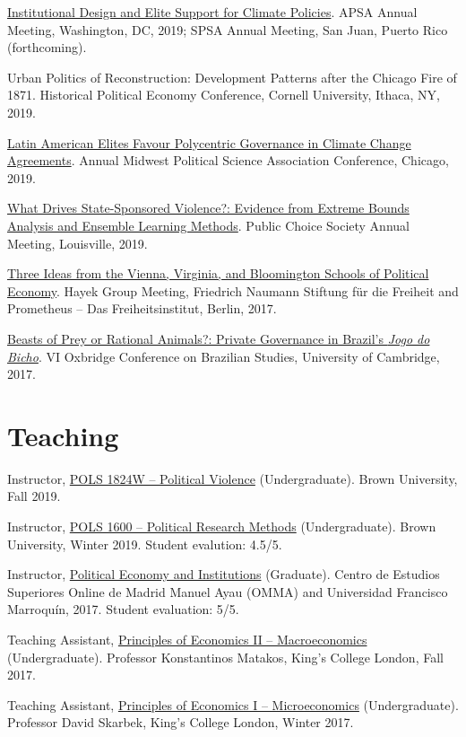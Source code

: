 \documentclass[a4paper]{article}
\renewenvironment{itemize}{
	\begin{list}{}{
			\setlength{\leftmargin}{1.5em}
		}
		}{
	\end{list}
}
\begin{document}
	\begin{itemize}
		\item \href{https://osf.io/9a6ch}{Institutional Design and Elite Support for Climate Policies}. APSA Annual Meeting, Washington, DC, 2019; SPSA Annual Meeting, San Juan, Puerto Rico (forthcoming).
		\item Urban Politics of Reconstruction: Development Patterns after the Chicago Fire of 1871. Historical Political Economy Conference, Cornell University, Ithaca, NY, 2019.
		\item \href{https://osf.io/9a6ch}{Latin American Elites Favour Polycentric Governance in Climate Change Agreements}. Annual Midwest Political Science Association Conference, Chicago, 2019.
		\item \href{http://danilofreire.github.io/pcs-2019}{What Drives State-Sponsored Violence?: Evidence from Extreme Bounds Analysis and Ensemble Learning Methods}. Public Choice Society Annual Meeting, Louisville, 2019.
		\item \href{https://www.overleaf.com/project/591ef5259fb58ede3dc4d369}{Three Ideas from the Vienna, Virginia, and Bloomington Schools of Political Economy}. Hayek Group Meeting, Friedrich Naumann Stiftung f{\"u}r die Freiheit and Prometheus -- Das Freiheitsinstitut, Berlin, 2017.
		\item \href{https://osf.io/se2jr}{Beasts of Prey or Rational Animals?: Private Governance in Brazil's \emph{Jogo do Bicho}}. VI Oxbridge Conference on Brazilian Studies, University of Cambridge, 2017.
	\end{itemize}

	\section*{Teaching}

	\begin{itemize}
	\item Instructor, \href{http://danilofreire.github.io/pols1842w}{POLS 1824W -- Political Violence} (Undergraduate). Brown University, Fall 2019.
	\item Instructor, \href{http://danilofreire.github.io}{POLS 1600 -- Political Research Methods} (Undergraduate). Brown University, Winter 2019. Student evalution: 4.5/5.
	\item Instructor, \href{https://github.com/danilofreire/economia-politica-instituicoes-ufm}{Political Economy and Institutions} (Graduate). Centro de Estudios Superiores Online de Madrid Manuel Ayau (OMMA) and Universidad Francisco Marroquín, 2017. Student evaluation: 5/5.
	\item Teaching Assistant, \href{https://github.com/danilofreire/core-econ}{Principles of Economics II -- Macroeconomics} (Undergraduate). Professor Konstantinos Matakos, King's College London, Fall 2017.
	\item Teaching Assistant, \href{https://github.com/danilofreire/core-econ}{Principles of Economics I -- Microeconomics} (Undergraduate). Professor David Skarbek, King's College London, Winter 2017.
	\end{itemize}
\end{document}
